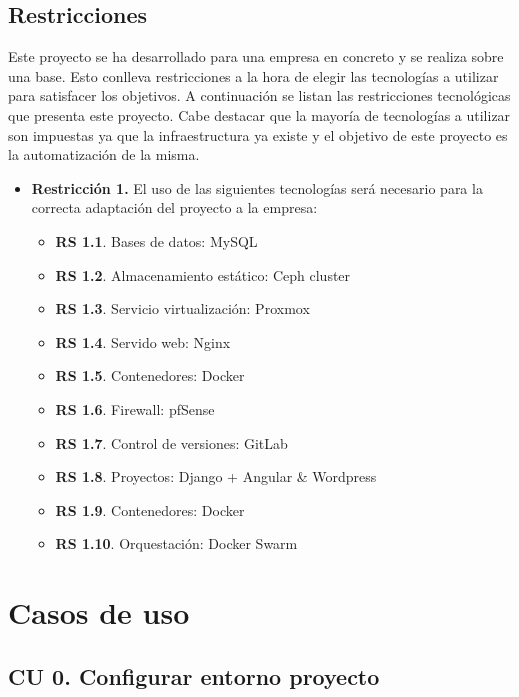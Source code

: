 	\subsection{Restricciones}
	\label{restricciones}
	\begin{text}
		Este proyecto se ha desarrollado para una empresa en concreto y se realiza sobre una base. Esto conlleva restricciones a la hora de elegir las tecnologías a utilizar para satisfacer los objetivos. A continuación se listan las restricciones tecnológicas que presenta este proyecto. Cabe destacar que la mayoría de tecnologías a utilizar son impuestas ya que la infraestructura ya existe y el objetivo de este proyecto es la automatización de la misma.
		
		\begin{itemize}
			\item \textbf{Restricción 1.} El uso de las siguientes tecnologías será necesario para la correcta adaptación del proyecto a la empresa:
			\begin{itemize}
				\item \textbf{RS 1.1}. Bases de datos: MySQL
				\item \textbf{RS 1.2}. Almacenamiento estático: Ceph cluster
				\item \textbf{RS 1.3}. Servicio virtualización: Proxmox
				\item \textbf{RS 1.4}. Servido web: Nginx
				\item \textbf{RS 1.5}. Contenedores: Docker
				\item \textbf{RS 1.6}. Firewall: pfSense
				\item \textbf{RS 1.7}. Control de versiones: GitLab
				\item \textbf{RS 1.8}. Proyectos: Django + Angular \& Wordpress
				\item \textbf{RS 1.9}. Contenedores: Docker
				\item \textbf{RS 1.10}. Orquestación: Docker Swarm
			\end{itemize}
		\end{itemize}
	\end{text}

\section{Casos de uso}
\label{casosdeuso}
	\subsection{CU 0. Configurar entorno proyecto}
	
